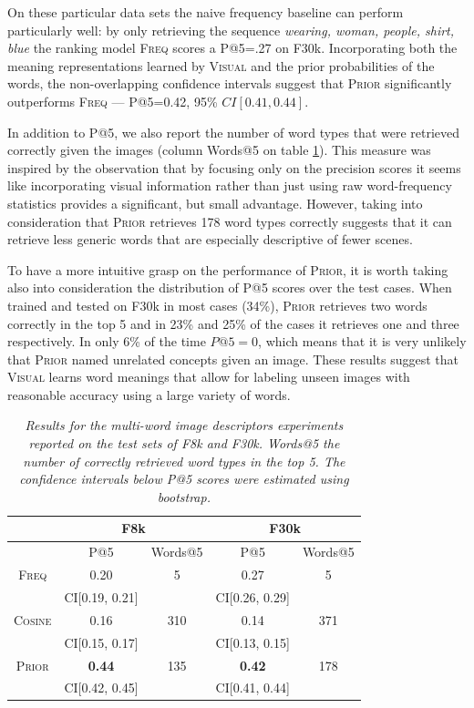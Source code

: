 On these particular data sets the naive frequency
baseline can perform particularly well: by only retrieving the
sequence \emph{wearing, woman, people, shirt, blue} 
the ranking model \textsc{Freq} scores a P@5=.27
on F30k. Incorporating both the meaning representations learned by \textsc{Visual} and
the prior probabilities of the words, the non-overlapping
confidence intervals suggest that \textsc{Prior} significantly outperforms
\textsc{Freq} --- P@5=0.42, 95\% $CI [0.41, 0.44]$.

In addition to P@5, we also report the number of word types that
were retrieved correctly given the images (column Words@5 on table \ref{tab:precision}).
This measure was inspired by the observation that \label{rev:comined metric}
by focusing only on the precision scores it seems like
incorporating visual information rather than just using raw
word-frequency statistics provides a significant, but small
advantage. However, taking into consideration that \textsc{Prior}
retrieves 178 word types correctly suggests that it can retrieve less generic words that
are especially descriptive of fewer scenes.

\label{rev:intuitive multiword}To have a more intuitive grasp on the performance of \textsc{Prior}, it is
worth taking also into consideration the distribution of P@5 scores over the
test cases. When trained and tested on F30k in most cases (34\%), \textsc{Prior}
retrieves two words correctly in the top 5 and in 23\% and 25\% of the cases it retrieves one and
three respectively. In only 6\% of the time $P@5=0$,
which means that it is very unlikely that \textsc{Prior} named unrelated concepts
given an image.  These results suggest that \textsc{Visual} learns word meanings that
allow for labeling unseen images with reasonable accuracy using a large variety of words.

\begin{table}[h]
\centering
\begin{tabular}{|c|c|c|c|c|}
\hline
& \multicolumn{2}{|c|}{F8k} & \multicolumn{2}{|c|}{F30k} \\
\hline
 & P@5 & Words@5 & P@5 & Words@5 \\
\hline
\textsc{Freq}    & 0.20 & 5 &  0.27 &  5 \\
         &  CI[0.19, 0.21] & & CI[0.26, 0.29] & \\
\textsc{Cosine}  & 0.16 & 310 &  0.14 &  371\\
         &  CI[0.15, 0.17] & &  CI[0.13, 0.15] & \\
\textsc{Prior} & \bf{0.44}  & 135 &  \bf{0.42} & 178\\
         &  CI[0.42, 0.45] & &  CI[0.41, 0.44] &\\
\hline
\end{tabular}
\caption{\textit{Results for the multi-word image descriptors experiments
  reported on the test sets of F8k and F30k.  Words@5
  the number of correctly retrieved word types in
  the top 5. The confidence intervals below P@5 scores were
  estimated using bootstrap.}}
\label{tab:precision}
\end{table}


